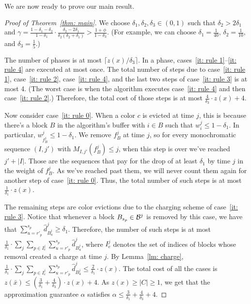 \documentclass[11pt]{article}
\newenvironment{proofof}[1]{\begin{proof}[Proof of #1]}{\end{proof}}
\begin{document}
We are now ready to prove our main result.
\begin{proofof}{Theorem~\ref{thm: main}}
We choose $\delta_1,\delta_2,\delta_3\in (0,1)$
such that $\delta_2 > 2\delta_1$ and
$\gamma = \frac{1-\delta_1-\delta_2}{1-\delta_1}\cdot
\frac{\delta_2- 2\delta_1}{\delta_2(\delta_2+\delta_1)}
> \frac{1 + \phi}{1-\delta_3}$.
(For example, we can choose $\delta_1 = \frac{1}{40}$,
$\delta_2 = \frac{1}{10}$, and $\delta_3 = \frac{1}{5}$.)

The number of phases is at most $\lceil z(x) / \delta_3\rceil$.
In a phase, cases~\ref{it: rule 1}--\ref{it: rule 4} are executed
at most once. The total number of steps due to case~\ref{it: rule 1},
case~\ref{it: rule 2}, case~\ref{it: rule 4}, and the last two steps of
case~\ref{it: rule 3} is at most 4. (The worst case is when the
algorithm executes case~\ref{it: rule 4} and then case~\ref{it: rule 2}.)
Therefore, the total cost of those steps is at most
$\frac{4}{\delta_3}\cdot z(x) + 4$.

Now consider case~\ref{it: rule 0}. When a color $c$ is evicted
at time $j$, this is because there's a block $B$ in the algorithm's
buffer with $i\in B$ such that $w^j_i\le 1 - \delta_1$. In particular,
$w^j_{f^j_B}\le 1 - \delta_1$. We remove $f^j_B$ at time $j$, so
for every monochromatic sequence $(I,j')$ with $M_{I,j'}(f^j_B)\le j$,
when this step is over we've reached $j'+ |I|$. Those are the sequences
that pay for the drop of at least $\delta_1$ by time $j$ in the weight
of $f^j_B$. As we've reached past them, we will never count them
again for another step of case~\ref{it: rule 0}. Thus, the total number
of such steps is at most $\frac{1}{\delta_1}\cdot z(x)$.

The remaining steps are color evictions due to the charging
scheme of case~\ref{it: rule 3}. Notice that whenever a block
$B_{s_p}\in {\cal B}^j$ is removed by this case, we have that
$\sum_{u=r'_p}^{s_p} \hat{d}^j_{B^j_u}\ge \delta_1$.
Therefore, the number of such steps is at most
$\frac{1}{\delta_1}\cdot \sum_j \sum_{p\in I^j_e}
\sum_{u=r'_p}^{s_p} \hat{d}^j_{B^j_u}$,
where $I^j_e$ denotes the set of indices of blocks whose removal
created a charge at time $j$. By Lemma~\ref{lm: charge},
$\frac{1}{\delta_1}\cdot
\sum_j \sum_{p\in I^j_e}\sum_{u=r'_p}^{s_p} \hat{d}^j_{B^j_u}\le
\frac{2}{\delta_1}\cdot z(x)$.
The total cost of all the cases is
$z(\bar{x})\le \left(\frac{3}{\delta_1} + \frac{4}{\delta_3}\right)\cdot z(x) + 4$.
As $z(x)\ge |C|\ge 1$, we get that the approximation guarantee $\alpha$
satisfies
$\alpha\le \frac{3}{\delta_1} + \frac{4}{\delta_3} + 4$.
\end{proofof}
\end{document}
